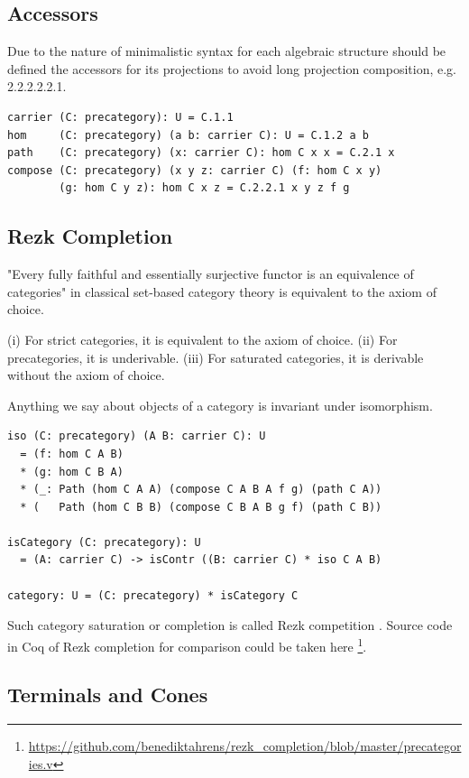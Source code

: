 \documentclass{article}
\begin{document}
\subsection*{Accessors}

Due to the nature of minimalistic syntax for each algebraic structure
should be defined the accessors for its projections to avoid long projection
composition, e.g. 2.2.2.2.2.1.

\begin{lstlisting}[mathescape=true]
carrier (C: precategory): U = C.1.1
hom     (C: precategory) (a b: carrier C): U = C.1.2 a b
path    (C: precategory) (x: carrier C): hom C x x = C.2.1 x
compose (C: precategory) (x y z: carrier C) (f: hom C x y)
        (g: hom C y z): hom C x z = C.2.2.1 x y z f g
\end{lstlisting}

\subsection{Rezk Completion}

"Every fully faithful and essentially surjective functor
is an equivalence of categories" in classical set-based category
theory is equivalent to the axiom of choice.

(i) For strict categories, it is equivalent to the axiom of choice.
(ii) For precategories, it is underivable.
(iii) For saturated categories, it is derivable without the axiom of choice.

Anything we say about objects of a category is invariant under isomorphism.

\begin{lstlisting}
iso (C: precategory) (A B: carrier C): U
  = (f: hom C A B)
  * (g: hom C B A)
  * (_: Path (hom C A A) (compose C A B A f g) (path C A))
  * (   Path (hom C B B) (compose C B A B g f) (path C B))

isCategory (C: precategory): U
  = (A: carrier C) -> isContr ((B: carrier C) * iso C A B)

category: U = (C: precategory) * isCategory C
\end{lstlisting}

Such category saturation or completion is called Rezk competition \cite{Shulman15}.
Source code in Coq of Rezk completion for comparison could be taken here \footnote{\url{https://github.com/benediktahrens/rezk_completion/blob/master/precategories.v}}.

\subsection{Terminals and Cones}
\end{document}

